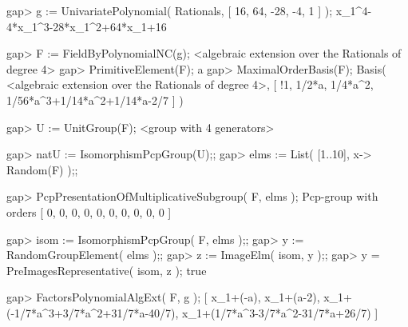 \beginexample
gap> g := UnivariatePolynomial( Rationals, [ 16, 64, -28, -4, 1 ] );
x_1^4-4*x_1^3-28*x_1^2+64*x_1+16

gap> F := FieldByPolynomialNC(g);
<algebraic extension over the Rationals of degree 4>
gap> PrimitiveElement(F);
a
gap> MaximalOrderBasis(F);
Basis( <algebraic extension over the Rationals of degree 4>,
[ !1, 1/2*a, 1/4*a^2, 1/56*a^3+1/14*a^2+1/14*a-2/7 ] )

gap> U := UnitGroup(F);
<group with 4 generators>

gap> natU := IsomorphismPcpGroup(U);;
gap> elms := List( [1..10], x-> Random(F) );;

gap>  PcpPresentationOfMultiplicativeSubgroup( F, elms );
Pcp-group with orders [ 0, 0, 0, 0, 0, 0, 0, 0, 0, 0 ]

gap> isom := IsomorphismPcpGroup( F, elms );;
gap> y := RandomGroupElement( elms );;
gap> z := ImageElm( isom, y );;
gap> y = PreImagesRepresentative( isom, z );
true

gap> FactorsPolynomialAlgExt( F, g );
[ x_1+(-a), x_1+(a-2), x_1+(-1/7*a^3+3/7*a^2+31/7*a-40/7),
  x_1+(1/7*a^3-3/7*a^2-31/7*a+26/7) ]
\endexample



























